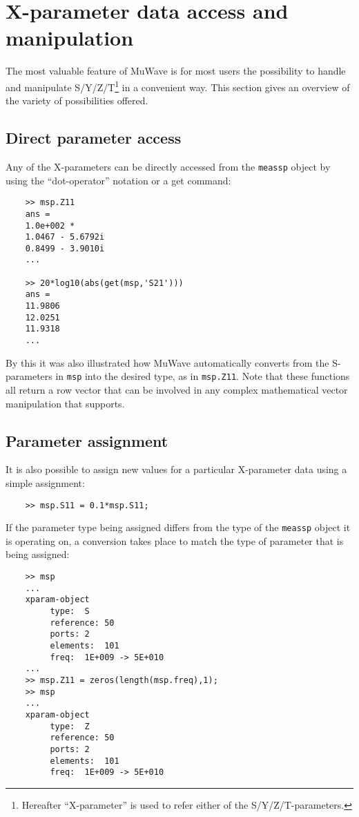 %
%
%
\section{X-parameter data access and manipulation}\label{sec:SPMod}
The most valuable feature of MuWave is for most users the
possibility to handle and manipulate S/Y/Z/T\footnote{Hereafter
``X-parameter'' is used to refer either of the
S/Y/Z/T-parameters.} in a convenient way. This section gives an
overview of the variety of possibilities offered.

\subsection{Direct parameter access}
Any of the X-parameters can be directly accessed from the
\verb"meassp" object by using the ``dot-operator'' notation or a
get command:

\begin{small}
\begin{verbatim}
    >> msp.Z11
    ans =
    1.0e+002 *
    1.0467 - 5.6792i
    0.8499 - 3.9010i
    ...

    >> 20*log10(abs(get(msp,'S21')))
    ans =
    11.9806
    12.0251
    11.9318
    ...
\end{verbatim}
\end{small}

By this it was also illustrated how MuWave automatically converts
from the S-para\-meters in \verb"msp" into the desired type, as in
\verb"msp.Z11". Note that these functions all return a row vector
that can be involved in any complex mathematical vector
manipulation that \matlab supports.

\subsection{Parameter assignment}
It is also possible to assign new values for a particular
X-parameter data using a simple assignment:
\begin{small}
\begin{verbatim}
    >> msp.S11 = 0.1*msp.S11;
\end{verbatim}
\end{small}
If the parameter type being assigned differs from the type of the
\verb"meassp" object it is operating on, a conversion takes place
to match the type of parameter that is being assigned:
\begin{small}
\begin{verbatim}
    >> msp
    ...
    xparam-object
    	 type:	S
    	 reference:	50
    	 ports:	2
    	 elements:	101
    	 freq:	1E+009 -> 5E+010
    ...
    >> msp.Z11 = zeros(length(msp.freq),1);
    >> msp
    ...
    xparam-object
    	 type:	Z
    	 reference:	50
    	 ports:	2
    	 elements:	101
    	 freq:	1E+009 -> 5E+010
\end{verbatim}
\end{small}

